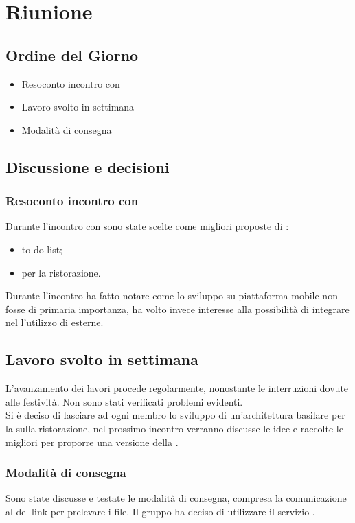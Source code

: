 
\section{Riunione}
\subsection{Ordine del Giorno}
\begin{itemize}
	\item Resoconto incontro con \Proponente{}
	\item Lavoro svolto in settimana 
	\item Modalità di consegna
\end{itemize}

\subsection{Discussione e decisioni}
\subsubsection{Resoconto incontro con \Proponente{}}
Durante l'incontro con \Proponente{} sono state scelte come migliori proposte di :
\begin{itemize}
	\item to-do list;
	\item {} per la ristorazione.
\end{itemize}
Durante l'incontro \Proponente{} ha fatto notare come lo sviluppo su piattaforma mobile non fosse di primaria importanza, ha volto invece interesse alla possibilità di integrare nel  l'utilizzo di  esterne.

\subsection{Lavoro svolto in settimana}
L'avanzamento dei lavori procede regolarmente, nonostante le interruzioni dovute alle festività. Non sono stati verificati problemi evidenti.\\
Si è deciso di lasciare ad ogni membro lo sviluppo di un'architettura basilare per la  sulla ristorazione, nel prossimo incontro verranno discusse le idee e raccolte le migliori per proporre una versione della .

\subsubsection{Modalità di consegna}
Sono state discusse e testate le modalità di consegna, compresa la comunicazione al \Committente{} del link per prelevare i file. Il gruppo ha deciso di utilizzare il servizio . 

\clearpage
